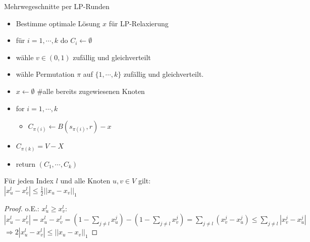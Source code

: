 \begin{section}{Mehrwegeschnitte per LP-Runden}
\begin{itemize}
   \item Bestimme optimale Lösung $x$ für LP-Relaxierung
   \item für $i = 1,\cdots,k$ do $C_i \leftarrow \emptyset$
   \item wähle $v\in (0,1)$ zufällig und gleichverteilt
   \item wähle Permutation $\pi$ auf $\{1,\cdots,k\}$ zufällig und gleichverteilt.
   \item $x \leftarrow \emptyset $ \#alle bereits zugewiesenen Knoten
   \item for $i=1,\cdots,k$
   \begin{itemize}
    \item $C_{\pi(i)} \leftarrow B(s_{\pi(i)},r)-x$
   \end{itemize}
   \item $C_{\pi(k)} = V-X$
   \item return $(C_1,\cdots,C_k)$
  \end{itemize}
  
  \begin{lemma}
   Für jeden Index $l$ und alle Knoten $u,v \in V$ gilt: \\
   $|x_u^l-x_v^l| \leq \frac{1}{2}||x_u-x_v||_1$
  \end{lemma}
  \begin{proof}
   o.E.: $x_u^l \geq x_v^l$: $|x_u^l-x_v^l| = x_u^l - x_v^l = (1-\sum_{j\neq l} x_u^j)-(1-\sum_{j\neq l} x_v^j) = \sum_{j \neq l} (x_v^j-x_u^j) \leq \sum_{j\neq l} |x_v^j - x_u^j|$\\
   $\Rightarrow 2|x_u^l - x_v^l| \leq ||x_u -x_v||_1$
  \end{proof}
  

\end{section}
